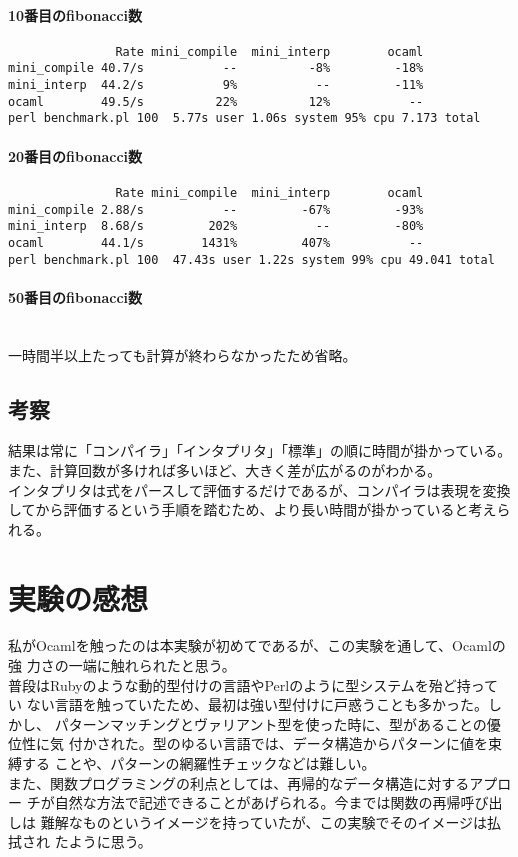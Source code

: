 \documentclass[a4paper,9pt]{jsarticle}
\begin{document}
\paragraph{10番目のfibonacci数}
\mbox{}
\begin{lstlisting}
               Rate mini_compile  mini_interp        ocaml
mini_compile 40.7/s           --          -8%         -18%
mini_interp  44.2/s           9%           --         -11%
ocaml        49.5/s          22%          12%           --
perl benchmark.pl 100  5.77s user 1.06s system 95% cpu 7.173 total
\end{lstlisting}

\paragraph{20番目のfibonacci数}
\mbox{}
\begin{lstlisting}
               Rate mini_compile  mini_interp        ocaml
mini_compile 2.88/s           --         -67%         -93%
mini_interp  8.68/s         202%           --         -80%
ocaml        44.1/s        1431%         407%           --
perl benchmark.pl 100  47.43s user 1.22s system 99% cpu 49.041 total
\end{lstlisting}

\paragraph{50番目のfibonacci数}
\mbox{}\\
一時間半以上たっても計算が終わらなかったため省略。


\subsection{考察}
結果は常に「コンパイラ」「インタプリタ」「標準」の順に時間が掛かっている。
また、計算回数が多ければ多いほど、大きく差が広がるのがわかる。\\
インタプリタは式をパースして評価するだけであるが、コンパイラは表現を変換
してから評価するという手順を踏むため、より長い時間が掛かっていると考えら
れる。

\section{実験の感想}
私がOcamlを触ったのは本実験が初めてであるが、この実験を通して、Ocamlの強
力さの一端に触れられたと思う。\\
普段はRubyのような動的型付けの言語やPerlのように型システムを殆ど持ってい
ない言語を触っていたため、最初は強い型付けに戸惑うことも多かった。しかし、
パターンマッチングとヴァリアント型を使った時に、型があることの優位性に気
付かされた。型のゆるい言語では、データ構造からパターンに値を束縛する
ことや、パターンの網羅性チェックなどは難しい。\\
また、関数プログラミングの利点としては、再帰的なデータ構造に対するアプロー
チが自然な方法で記述できることがあげられる。今までは関数の再帰呼び出しは
難解なものというイメージを持っていたが、この実験でそのイメージは払拭され
たように思う。
\end{document}
